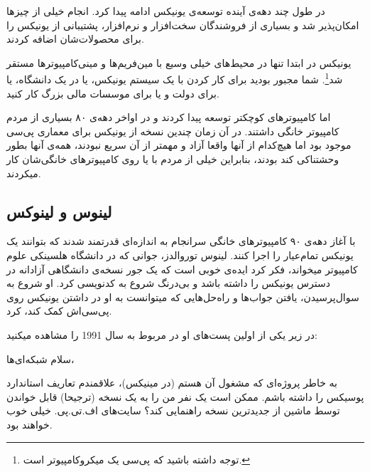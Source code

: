 در طول چند دهه‌ی آینده توسعه‌ی یونیکس ادامه پیدا کرد. انجام خیلی از چیزها امکان‌پذیر شد و بسیاری از فروشندگان سخت‌افزار و نرم‌افزار، پشتیبانی از یونیکس را برای محصولات‌شان اضافه کردند.

یونیکس در ابتدا تنها در محیط‌های خیلی وسیع با مین‌فریم‌ها و مینی‌کامپیوتر‌ها مستقر شد\footnote{توجه داشته باشید که پی‌سی یک میکروکامپیوتر است.}. شما مجبور بودید برای کار کردن با یک سیستم یونیکس، یا در یک دانشگاه، یا برای دولت و یا برای موسسات مالی بزرگ کار کنید.

اما کامپیوترهای کوچکتر توسعه پیدا کردند و در اواخر دهه‌ی ۸۰ بسیاری از مردم کامپیوتر خانگی داشتند. در آن زمان چندین نسخه از یونیکس برای معماری پی‌سی موجود بود اما هیچ‌کدام از آنها واقعا آزاد و مهمتر از آن سریع نبودند، همه‌ی آنها بطور وحشتناکی کند بودند، بنابراین خیلی از مردم با 
 یا 
 روی کامپیوترهای خانگی‌شان کار میکردند.
\subsection*{لینوس و لینوکس}
با آغاز دهه‌ی ۹۰ کامپیوترهای خانگی سرانجام به اندازه‌ای قدرتمند شدند که بتوانند یک یونیکس تمام‌عیار را اجرا کنند. لینوس توروالدز، جوانی که در دانشگاه هلسینکی علوم کامپیوتر میخواند، فکر کرد ایده‌ی خوبی است که یک جور نسخه‌ی دانشگاهی آزادانه در دسترس یونیکس را داشته باشد و بی‌درنگ شروع به کدنویسی کرد.
او شروع به سوال‌پرسیدن، یافتن جواب‌ها و راه‌حل‌هایی که میتوانست به او در داشتن یونیکس روی پی‌سی‌اش کمک کند، کرد. 

در زیر یکی از اولین پست‌های او در 
 مربوط به سال 1991 را مشاهده میکنید:
 \begin{mybox} 
\begin{flushleft}
 	 
 	
 	

\end{flushleft}
 	
 سلام شبکه‌ای‌ها، 

 به خاطر پروژه‌ای که مشغول آن هستم (در مینیکس)، علاقمندم تعاریف استاندارد پوسیکس را داشته باشم. ممکن است یک نفر من را به یک نسخه (ترجیحا) قابل خواندن توسط ماشین از جدیدترین نسخه راهنمایی کند؟ سایت‌های اف.تی.پی. خیلی خوب خواهند بود.
 \end{mybox}

